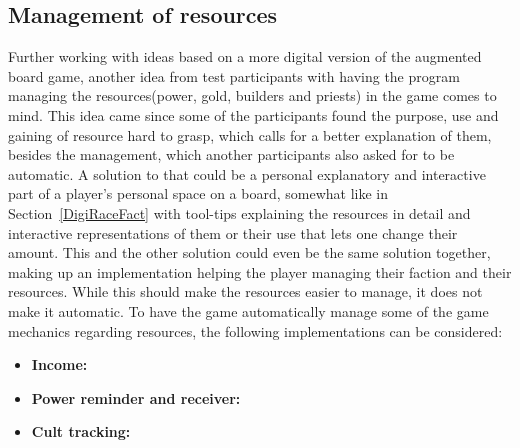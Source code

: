 \subsection{Management of resources}
Further working with ideas based on a more digital version of the augmented board game, another idea from test participants with having the program managing the resources(power, gold, builders and priests) in the game comes to mind. This idea came since some of the participants found the purpose, use and gaining of resource hard to grasp, which calls for a better explanation of them, besides the management, which another participants also asked for to be automatic. A solution to that could be a personal explanatory and interactive part of a player's personal space on a board, somewhat like in Section~\ref{DigiRaceFact} with tool-tips explaining the resources in detail and interactive representations of them or their use that lets one change their amount. This and the other solution could even be the same solution together, making up an implementation helping the player managing their faction and their resources. 
While this should make the resources easier to manage, it does not make it automatic. To have the game automatically manage some of the game mechanics regarding resources, the following implementations can be considered:
\begin{itemize}
\item \textbf{Income:} 
\item \textbf{Power reminder and receiver:} 
\item \textbf{Cult tracking:} 
\end{itemize}




